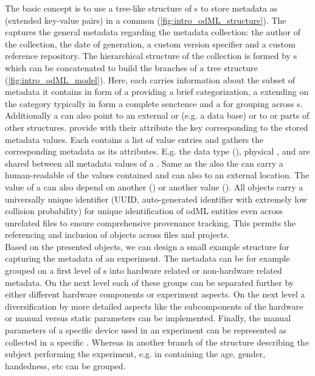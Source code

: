 The basic concept is to use a tree-like structure of s to store metadata as  (extended key-value pairs) in a common  (\cref{fig:intro_odML_structure}). The  captures the general metadata regarding the metadata collection: the author of the collection, the date of generation, a custom version specifier and a custom reference repository. The hierarchical structure of the collection is formed by s which can be concatenated to build the branches of a tree structure (\cref{fig:intro_odML_model}). Here, each  carries information about the subset of metadata it contains in form of a   providing a brief categorization, a  extending on the category typically in form a complete senctence and a  for grouping across s. Additionally a  can also point to an external  or  (e.g. a data base) or  to or  parts of other  structures.  provide with their  attribute the key corresponding to the stored metadata values. Each  contains a list of value entries and gathers the corresponding metadata as its  attributes. E.g. the data type (), physical ,  and  are shared between all metadata values of a . Same as the  also the  can carry a human-readable  of the values contained and can also  to an external location. The value of a  can also depend on another  () or another  value (). All  objects carry a universally unique identifier (UUID, auto-generated identifier with extremely low collision probability) for unique identification of odML entities even across unrelated files to ensure comprehensive provenance tracking. This permits the referencing and inclusion of  objects across files and projects.\\

Based on the presented  objects, we can design a small example structure for capturing the metadata of an experiment. The metadata can be for example grouped on a first level of s into hardware related or non-hardware related metadata. On the next level each of these groups can be separated further by either different hardware components or experiment aspects. On the next level a diversification by more detailed aspects like the subcomponents of the hardware or manual versus static parameters can be implemented. Finally, the manual parameters of a specific device used in an experiment can be represented as  collected in a specific . Whereas in another branch of the  structure  describing the subject performing the experiment, e.g. in  containing the age, gender, handedness, etc can be grouped.

